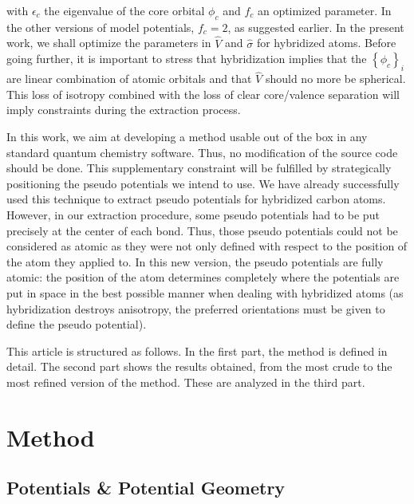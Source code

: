\documentclass[journal=jctcce,manuscript=article]{achemso}
\begin{document}
with $\epsilon_c$ the eigenvalue of the core orbital $\phi_c$ and
$f_c$ an optimized parameter.
In the other versions of model potentials, $f_c=2$, as suggested earlier.\cite{houjer_aspects_1978}
In the present work, we shall optimize the parameters in $\hat{V}$ and $\hat{\sigma}$
for hybridized atoms.
Before going further, it is important to stress that hybridization implies that the
$\left\{\phi_c\right\}_i$ are linear combination of atomic orbitals and that
$\hat{V}$ should no more be spherical.
This loss of isotropy combined with the loss of clear core/valence separation
will imply constraints during the extraction process.

In this work, we aim at developing a method usable out of the box in any standard
quantum chemistry software.
Thus, no modification of the source code should be done.
This supplementary constraint will be fulfilled by strategically positioning the pseudo potentials
we intend to use. 
We have already successfully used this technique to extract pseudo potentials for hybridized carbon
atoms.\cite{drujon_pseudopotentials_2013}
However, in our extraction procedure, some pseudo potentials had to be put precisely at the center
of each bond.
Thus, those pseudo potentials could not be considered as atomic as they were not only defined
with respect to the position of the atom they applied to.
In this new version, the pseudo potentials are fully atomic: the position of the atom
determines completely where the potentials are put in space in the best possible manner
when dealing with hybridized atoms (as hybridization destroys anisotropy, the preferred orientations
must be given to define the pseudo potential).

This article is structured as follows.
In the first part, the method is defined in detail.
The second part shows the results obtained, from the most crude to the most refined
version of the method.
These are analyzed in the third part.

\section{Method}

\subsection{Potentials \& Potential Geometry}
\end{document}
